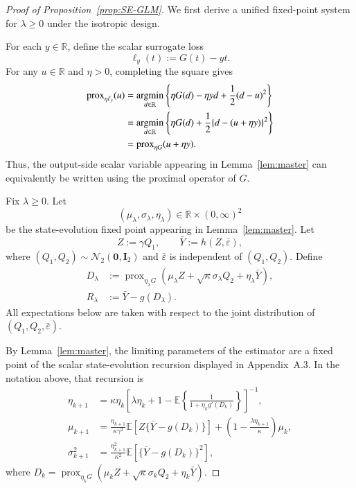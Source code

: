 \documentclass[12pt,reqno]{amsart}
\DeclareMathOperator*{\argmin}{arg min}
\newcommand{\ccc}{\color{black}}
\begin{document}
{\ccc
\begin{proof}[Proof of Proposition~\ref{prop:SE-GLM}]
We first derive a unified fixed-point system for $\lambda\ge0$ under the
isotropic design.

For each $y\in\mathbb{R}$, define the scalar surrogate loss
\[
\ell_y(t):=G(t)-yt.
\]
For any $u\in\mathbb{R}$ and $\eta>0$, completing the square gives
\begin{align}
\operatorname{prox}_{\eta\ell_y}(u)
&=
\argmin_{d\in\mathbb{R}}
\left\{
\eta G(d)-\eta yd+\frac12(d-u)^2
\right\}
\notag\\
&=
\argmin_{d\in\mathbb{R}}
\left\{
\eta G(d)
+
\frac12\{d-(u+\eta y)\}^2
\right\}
\notag\\
&=
\operatorname{prox}_{\eta G}(u+\eta y).
\label{eq:prox-loss-shift}
\end{align}
Thus, the output-side scalar variable appearing in
Lemma~\ref{lem:master} can equivalently be written using the proximal
operator of $G$.

Fix $\lambda\ge0$. Let
\[
(\mu_\lambda,\sigma_\lambda,\eta_\lambda)
\in\mathbb{R}\times(0,\infty)^2
\]
be the state-evolution fixed point appearing in
Lemma~\ref{lem:master}. Let
\[
Z:=\gamma Q_1,
\qquad
\bar Y:=h(Z,\bar\varepsilon),
\]
where $(Q_1,Q_2)\sim\mathcal{N}_2(\bm0,\bm I_2)$ and
$\bar\varepsilon$ is independent of $(Q_1,Q_2)$. Define
\begin{align}
D_\lambda
&:=
\operatorname{prox}_{\eta_\lambda G}
\left(
\mu_\lambda Z
+
\sqrt{\kappa}\sigma_\lambda Q_2
+
\eta_\lambda\bar Y
\right),
\label{eq:D-lambda-definition}\\
R_\lambda
&:=
\bar Y-g(D_\lambda).
\label{eq:R-lambda-definition}
\end{align}
All expectations below are taken with respect to the joint distribution of
$(Q_1,Q_2,\bar\varepsilon)$.

By Lemma~\ref{lem:master}, the limiting parameters of the estimator
are a fixed point of the scalar state-evolution recursion displayed in
Appendix~A.3. In the notation above, that recursion is
\begin{align}
\eta_{k+1}
&=
\kappa\eta_k
\left[
\lambda\eta_k+1
-
\mathbb{E}
\left\{
\frac{1}{1+\eta_k g'(D_k)}
\right\}
\right]^{-1},
\label{eq:eta-recursion-proof}\\
\mu_{k+1}
&=
\frac{\eta_{k+1}}{\kappa\gamma^2}
\mathbb{E}
\left[
Z\{\bar Y-g(D_k)\}
\right]
+
\left(
1-\frac{\lambda\eta_{k+1}}{\kappa}
\right)\mu_k,
\label{eq:mu-recursion-proof}\\
\sigma_{k+1}^2
&=
\frac{\eta_{k+1}^2}{\kappa^2}
\mathbb{E}
\left[
\{\bar Y-g(D_k)\}^2
\right],
\label{eq:sigma-recursion-proof}
\end{align}
where
$
D_k
=
\operatorname{prox}_{\eta_kG}
\left(
\mu_kZ+\sqrt{\kappa}\sigma_kQ_2+\eta_k\bar Y
\right).
$


\end{proof}}
\end{document}
